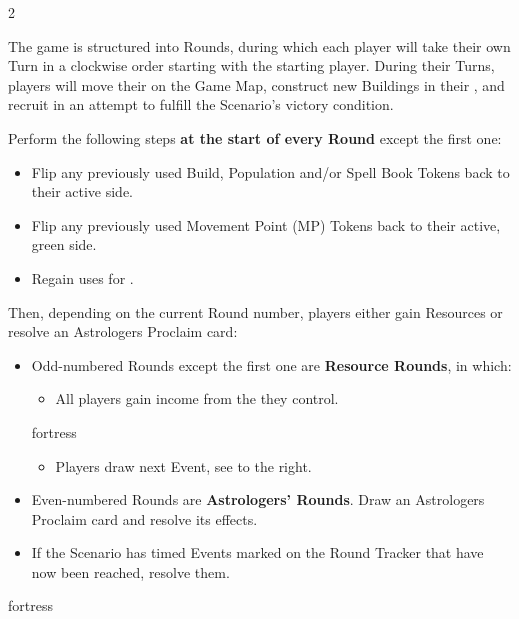 
\begin{multicols*}{2}

The game is structured into Rounds, during which each player will take their own Turn in a clockwise order starting with the starting player.
During their Turns, players will move their  on the Game Map, construct new Buildings in their , and recruit  in an attempt to fulfill the Scenario's victory condition.\par
Perform the following steps \textbf{at the start of every Round} except the first one:
\begin{itemize}
  \item Flip any previously used Build, Population and/or Spell Book Tokens back to their active side.
  \item Flip any previously used Movement Point (MP) Tokens back to their active, green side.
  \item Regain uses for .
\end{itemize}
Then, depending on the current Round number, players either gain Resources or resolve an Astrologers Proclaim card:
\begin{itemize}
  \item Odd-numbered Rounds except the first one are \textbf{Resource Rounds}, in which:
    \begin{itemize}
      \item All players gain income from the  they control.
    \end{itemize}
    \begin{expansion}[before skip balanced=0.4em]{fortress}
      \begin{itemize}
          \item Players draw next Event, see to the right.
      \end{itemize}
    \end{expansion}
  \item Even-numbered Rounds are \textbf{Astrologers' Rounds}.
    Draw an Astrologers Proclaim card and resolve its effects.
  \item If the Scenario has timed Events marked on the Round Tracker that have now been reached, resolve them.
\end{itemize}
  \vspace*{\fill}
\columnbreak
\begin{expansion}[before=\vspace*{-11mm}]{fortress}

\end{expansion}
\end{multicols*}
